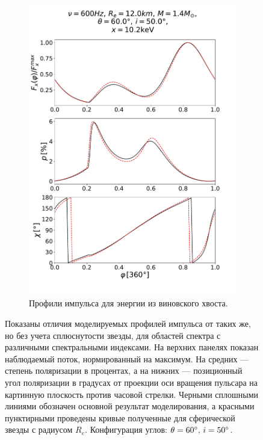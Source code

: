 \documentclass[14pt,a4paper]{extarticle}
\begin{document}
\begin{figure}[H]
\begin{subfigure}{.45\textwidth}
					\includegraphics[width=1.1\textwidth]{B0Comb0Ff140.pdf}
					\caption{\small\centering Профили импульса для энергии из виновского хвоста.}
				\end{subfigure}
				\caption{\small
					Показаны отличия моделируемых профилей импульса от таких же, но без учета сплюснутости звезды, для областей спектра с различными спектральными индексами.
					На верхних панелях показан наблюдаемый поток, нормированный на максимум. 
					На средних --- степень поляризации в процентах, а на нижних --- позиционный угол поляризации в градусах от проекции оси вращения пульсара на картинную плоскость против часовой стрелки.
					Черными сплошными линиями обозначен основной результат моделирования, а красными пунктирными проведены кривые полученные для сферической звезды с радиусом $R_e$. 
					Конфигурация углов: $\theta = 60 \degree, \, i = 50\degree$.
					}\label{B0Comp}
			\end{figure}
\end{document}
